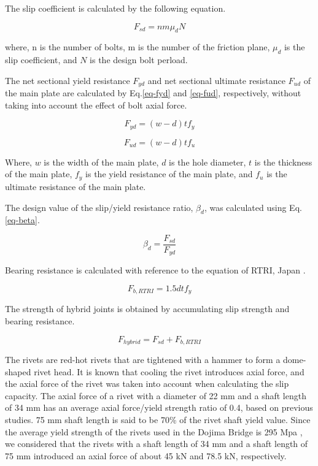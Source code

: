 The slip coefficient is calculated by the following equation.

\begin{equation} \label{eq-fs}
    F_{sd} = n m \mu_d N
\end{equation}

where, n is the number of bolts, m is the number of the friction plane, $\mu_d$ is the slip coefficient, and $N$ is the design bolt perload.

The net sectional yield resistance $F_{yd}$ and net sectional ultimate resistance $F_{ud}$ of the main plate are calculated by Eq.\ref{eq-fyd} and \ref{eq-fud}, respectively, without taking into account the effect of bolt axial force.

\begin{equation}\label{eq-fyd}
    F_{yd} = (w - d) t f_y
\end{equation}

\begin{equation}\label{eq-fud}
    F_{ud} = (w - d) t f_u
\end{equation}

Where, $w$ is the width of the main plate, $d$ is the hole diameter, $t$ is the thickness of the main plate, $f_y$ is the yield resistance of the main plate, and $f_u$ is the ultimate resistance of the main plate.

The design value of the slip/yield resistance ratio, $\beta_d$, was calculated using Eq. \ref{eq-beta}.

\begin{equation}\label{eq-beta}
    \beta_d = \frac{F_{sd}}{F_{yd}}
\end{equation}

Bearing resistance is calculated with reference to the equation of RTRI, Japan \cite{rtri1992Manual}.

\begin{equation}
    F_{b,RTRI} = 1.5 d t f_y
\end{equation}

The strength of hybrid joints is obtained by accumulating slip strength and bearing resistance.

\begin{equation}
    F_{hybrid} = F_{sd} + F_{b,RTRI}
\end{equation}

The rivets are red-hot rivets that are tightened with a hammer to form a dome-shaped rivet head. It is known that cooling the rivet introduces axial force, and the axial force of the rivet was taken into account when calculating the slip capacity. The axial force of a rivet with a diameter of 22 mm and a shaft length of 34 mm has an average axial force/yield strength ratio of 0.4, based on previous studies. 75 mm shaft length is said to be 70\% of the rivet shaft yield value. Since the average yield strength of the rivets used in the Dojima Bridge is 295 Mpa , we considered that the rivets with a shaft length of 34 mm and a shaft length of 75 mm introduced an axial force of about 45 kN and 78.5 kN, respectively.

